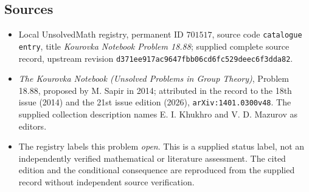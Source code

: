 \documentclass[11pt]{article}
\begin{document}
\subsection{Sources}
\begin{itemize}
\item Local UnsolvedMath registry, permanent ID \(701517\), source code \texttt{catalogue entry}, title \emph{Kourovka Notebook Problem 18.88}; supplied complete source record, upstream revision \texttt{d371ee917ac9647fbb06cd6fc529deec6f3dda82}.
\item \emph{The Kourovka Notebook (Unsolved Problems in Group Theory)}, Problem 18.88, proposed by M. Sapir in 2014; attributed in the record to the 18th issue (2014) and the 21st issue edition (2026), \texttt{arXiv:1401.0300v48}. The supplied collection description names E. I. Khukhro and V. D. Mazurov as editors.
\item The registry labels this problem \emph{open}. This is a supplied status label, not an independently verified mathematical or literature assessment. The cited edition and the conditional consequence are reproduced from the supplied record without independent source verification.
\end{itemize}
\end{document}
